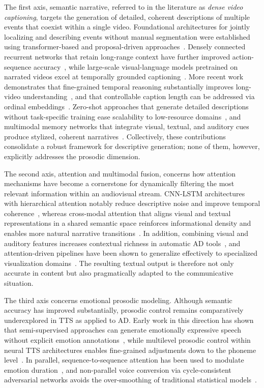 \documentclass[pdflatex,iicol,sn-mathphys-num]{sn-jnl}%
\theoremstyle{thmstyleone}%
\theoremstyle{thmstyletwo}%
\theoremstyle{thmstylethree}%
\begin{document}
The first axis, semantic narrative, referred to in the literature as \textit{dense video captioning}, targets the generation of detailed, coherent descriptions of multiple events that coexist within a single video. Foundational architectures for jointly localizing and describing events without manual segmentation were established using transformer-based and proposal-driven approaches~\cite{Zhou2018,Li2018}. Densely connected recurrent networks that retain long-range context have further improved action-sequence accuracy~\cite{Zhu2019}, while large-scale visual-language models pretrained on narrated videos excel at temporally grounded captioning~\cite{Yang2023}. More recent work demonstrates that fine-grained temporal reasoning substantially improves long-video understanding~\cite{Yuan2025}, and that controllable caption length can be addressed via ordinal embeddings~\cite{Nitta2024}. Zero-shot approaches that generate detailed descriptions without task-specific training ease scalability to low-resource domains~\cite{Xie2024}, and multimodal memory networks that integrate visual, textual, and auditory cues produce stylized, coherent narratives~\cite{Zhao2020}. Collectively, these contributions consolidate a robust framework for descriptive generation; none of them, however, explicitly addresses the prosodic dimension.

The second axis, attention and multimodal fusion, concerns how attention mechanisms have become a cornerstone for dynamically filtering the most relevant information within an audiovisual stream. CNN-LSTM architectures with hierarchical attention notably reduce descriptive noise and improve temporal coherence~\cite{Huang2022}, whereas cross-modal attention that aligns visual and textual representations in a shared semantic space reinforces informational density and enables more natural narrative transitions~\cite{Li2021}. In addition, combining visual and auditory features increases contextual richness in automatic AD tools~\cite{Shen2024a}, and attention-driven pipelines have been shown to generalize effectively to specialized visualization domains~\cite{Smits2024}. The resulting textual output is therefore not only accurate in content but also pragmatically adapted to the communicative situation.

The third axis concerns emotional prosodic modeling. Although semantic accuracy has improved substantially, prosodic control remains comparatively underexplored in TTS as applied to AD. Early work in this direction has shown that semi-supervised approaches can generate emotionally expressive speech without explicit emotion annotations~\cite{Cai2020}, while multilevel prosodic control within neural TTS architectures enables fine-grained adjustments down to the phoneme level~\cite{Cornille2022}. In parallel, sequence-to-sequence attention has been used to modulate emotion duration~\cite{Choi2021}, and non-parallel voice conversion via cycle-consistent adversarial networks avoids the over-smoothing of traditional statistical models~\cite{Kaneko2018}.
\end{document}
